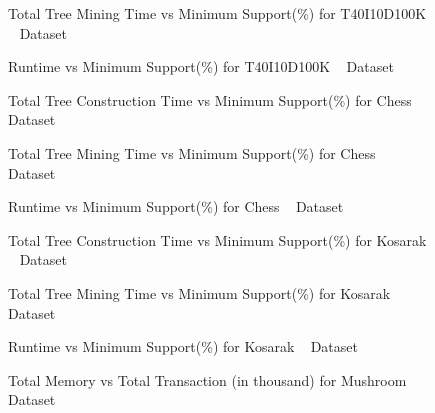     \begin{figure}[h]
    \centering
        
    \caption{Total Tree Mining Time vs Minimum Support(\%) for T40I10D100K ~\cite{dataset} Dataset }
    \label{result:g_t10_mining_total}
    \end{figure}
    
    \begin{figure}[h]
    \centering
        
    \caption{Runtime vs Minimum Support(\%) for T40I10D100K ~\cite{dataset} Dataset }
    \label{result:g_t10_total}
    \end{figure}

    \begin{figure}[h]
    \centering
        
    \caption{Total Tree Construction Time vs Minimum Support(\%) for Chess ~\cite{dataset} Dataset }
    \label{result:g_chess_tree_construction_total}
    \end{figure}
    
    \begin{figure}[h]
    \centering
        
    \caption{Total Tree Mining Time vs Minimum Support(\%) for Chess ~\cite{dataset} Dataset }
    \label{result:g_chess_mining_total}
    \end{figure}
    
    \begin{figure}[h]
    \centering
        
    \caption{Runtime vs Minimum Support(\%) for Chess ~\cite{dataset} Dataset }
    \label{result:g_chess_total}
    \end{figure}
    \begin{figure}[h]
    \centering
        
    \caption{Total Tree Construction Time vs Minimum Support(\%) for Kosarak ~\cite{dataset} Dataset }
    \label{result:g_k_tree_construction_total}
    \end{figure}
    
    \begin{figure}[h]
    \centering
        
    \caption{Total Tree Mining Time vs Minimum Support(\%) for Kosarak ~\cite{dataset} Dataset }
    \label{result:g_k_mining_total}
    \end{figure}

    \begin{figure}[h]
    \centering
        
    \caption{Runtime vs Minimum Support(\%) for Kosarak ~\cite{dataset} Dataset }
    \label{result:g_k_total}
    \end{figure}
    \begin{figure}[h]
    \centering
        
    \caption{Total Memory vs Total Transaction (in thousand) for Mushroom ~\cite{dataset} Dataset }
    \label{result:g_m_memory_node}
    \end{figure}
    
